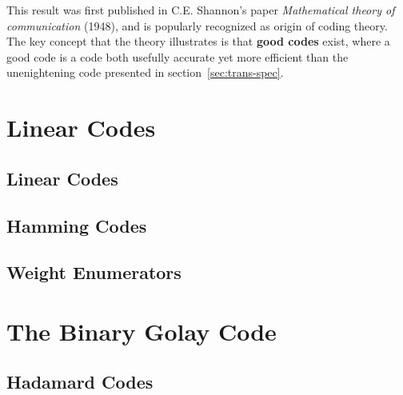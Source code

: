 \documentclass{article}
\renewcommand{\=}{\equiv}
\begin{document}
This result was first published in C.E. Shannon's paper \textit{Mathematical theory of communication} (1948), and is popularly recognized as origin of coding theory.
The key concept that the theory illustrates is that \textbf{good codes} exist, where a good code is a code both usefully accurate yet more efficient than the unenightening code presented in section~\ref{sec:trans-spec}.

\section{Linear Codes}

\subsection{Linear Codes}

\subsection{Hamming Codes}

\subsection{Weight Enumerators}

\section{The Binary Golay Code}

\subsection{Hadamard Codes}
\end{document}
